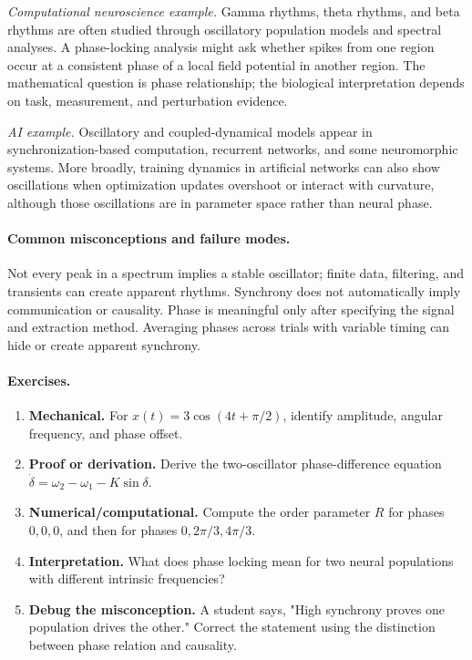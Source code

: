 \emph{Computational neuroscience example.}
Gamma rhythms, theta rhythms, and beta rhythms are often studied through oscillatory population models and spectral analyses. A phase-locking analysis might ask whether spikes from one region occur at a consistent phase of a local field potential in another region. The mathematical question is phase relationship; the biological interpretation depends on task, measurement, and perturbation evidence.

\emph{AI example.}
Oscillatory and coupled-dynamical models appear in synchronization-based computation, recurrent networks, and some neuromorphic systems. More broadly, training dynamics in artificial networks can also show oscillations when optimization updates overshoot or interact with curvature, although those oscillations are in parameter space rather than neural phase.

\paragraph{Common misconceptions and failure modes.}
Not every peak in a spectrum implies a stable oscillator; finite data, filtering, and transients can create apparent rhythms. Synchrony does not automatically imply communication or causality. Phase is meaningful only after specifying the signal and extraction method. Averaging phases across trials with variable timing can hide or create apparent synchrony.

\paragraph{Exercises.}
\begin{enumerate}[label=\textbf{49.3.\arabic*.}, leftmargin=*]
\item \textbf{Mechanical.} For \(x(t)=3\cos(4t+\pi/2)\), identify amplitude, angular frequency, and phase offset.
\item \textbf{Proof or derivation.} Derive the two-oscillator phase-difference equation \(\dot\delta=\omega_2-\omega_1-K\sin\delta\).
\item \textbf{Numerical/computational.} Compute the order parameter \(R\) for phases \(0,0,0\), and then for phases \(0,2\pi/3,4\pi/3\).
\item \textbf{Interpretation.} What does phase locking mean for two neural populations with different intrinsic frequencies?
\item \textbf{Debug the misconception.} A student says, "High synchrony proves one population drives the other." Correct the statement using the distinction between phase relation and causality.
\end{enumerate}

